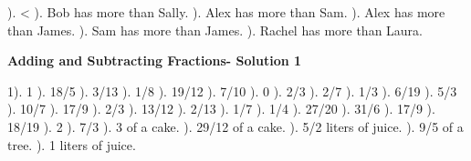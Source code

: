 \documentclass{article}%
\begin{document}
). <%
). Bob has more than Sally.%
). Alex has more than Sam.%
). Alex has more than James.%
). Sam has more than James.%
). Rachel has more than Laura.%
\newline%
\newpage%
\large%
\begin{center}%
\textbf{Adding and Subtracting Fractions- Solution 1}%
\newline%
\end{center} \normalsize%
1). 1%
). 18/5%
). 3/13%
). 1/8%
). 19/12%
). 7/10%
). 0%
). 2/3%
). 2/7%
). 1/3%
). 6/19%
). 5/3%
). 10/7%
). 17/9%
). 2/3%
). 13/12%
). 2/13%
). 1/7%
). 1/4%
). 27/20%
). 31/6%
). 17/9%
). 18/19%
). 2%
). 7/3%
). 3 of a cake.%
). 29/12 of a cake.%
). 5/2 liters of juice.%
). 9/5 of a tree.%
). 1 liters of juice.%
\newline%
\end{document}
